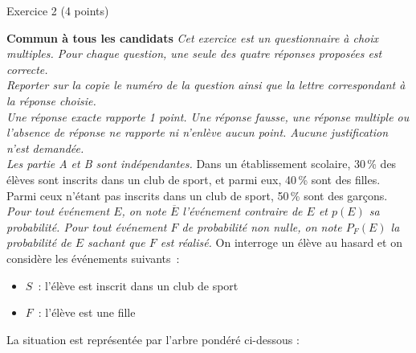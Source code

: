 
%
\begin{h2}Exercice 2 (4 points)\end{h2}
\textbf{Commun à  tous les candidats}
\medbreak
\emph{Cet exercice est un questionnaire à choix multiples. Pour chaque question, une seule des quatre réponses proposées est correcte.\\
     Reporter sur la copie le numéro de la question ainsi que la lettre correspondant à la réponse choisie.\\
     Une réponse exacte rapporte 1 point. Une réponse fausse, une réponse multiple ou l'absence de réponse ne rapporte ni n'enlève aucun point. Aucune justification n'est demandée.\\
Les partie \emph{A} et \emph{B} sont indépendantes.}
Dans un établissement scolaire, 30\,\% des élèves sont inscrits dans un club de sport, et parmi eux, 40\,\% sont des filles. Parmi ceux n'étant pas inscrits dans un club de sport, 50\,\% sont des garçons.
\smallbreak
\emph{Pour tout événement $E$, on note $\overline{E}$ l'événement contraire de $E$ et $p(E)$ sa probabilité. Pour tout événement $F$ de probabilité non nulle, on note $P_F(E)$ la probabilité de $E$ sachant que $F$ est réalisé.}
\medbreak
On interroge un élève au hasard et on considère les événements suivants~:
\begin{itemize}
     \item $S$~: \og l'élève est inscrit dans un club de sport \fg{}
     \item $F$~: \og l'élève est une fille \fg{}
\end{itemize}
La situation est représentée par l'arbre pondéré ci-dessous :
